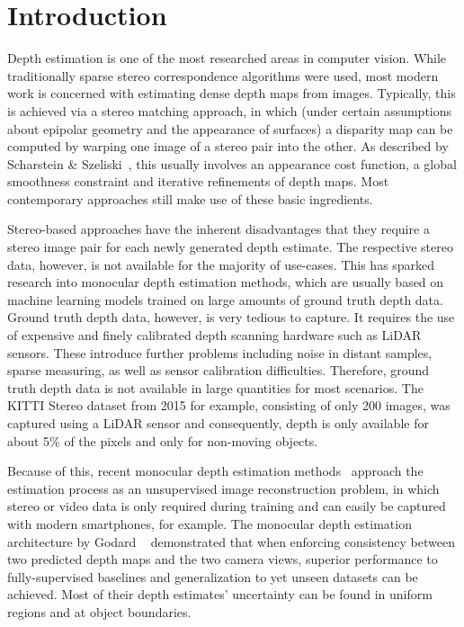 \section{Introduction}
Depth estimation is one of the most researched areas in computer vision.
While traditionally sparse stereo correspondence algorithms were used, most modern work is concerned with estimating dense depth maps from images.
Typically, this is achieved via a stereo matching approach, in which (under certain assumptions about epipolar geometry and the appearance of surfaces) a disparity map can be computed by warping one image of a stereo  pair into the other.
As described by Scharstein \& Szeliski~\cite{scharstein2002taxonomy}, this usually involves an appearance cost function, a global smoothness constraint and iterative refinements of depth maps.
Most contemporary approaches still make use of these basic ingredients.

Stereo-based approaches have the inherent disadvantages that they require a stereo image pair for each newly generated depth estimate.
The respective stereo data, however, is not available for the majority of use-cases.
This has sparked research into monocular depth estimation methods, which are usually based on machine learning models trained on large amounts of ground truth depth data.
Ground truth depth data, however, is very tedious to capture. 
It requires the use of expensive and finely calibrated depth scanning hardware such as LiDAR sensors. These introduce further problems including noise in distant samples, sparse measuring, as well as sensor calibration difficulties. Therefore, ground truth depth data is not available in large quantities for most scenarios.
The KITTI Stereo dataset from 2015 for example\cite{Menze2015CVPR}, consisting of only 200 images, was captured using a LiDAR sensor and consequently, depth is only available for about 5\% of the pixels and only for non-moving objects. 

Because of this, recent monocular depth estimation methods~\cite{garg2016unsupervised,Godard_2017_CVPR,Godard2018} approach the estimation process as an unsupervised image reconstruction problem, in which stereo or video data is only required during training and can easily be captured with modern smartphones, for example. 
The monocular depth estimation architecture by Godard \etal~\cite{Godard_2017_CVPR} demonstrated that when enforcing consistency between two predicted depth maps and the two camera views, superior performance to fully-supervised baselines and generalization to yet unseen datasets can be achieved.
Most of their depth estimates' uncertainty can be found in uniform regions and at object boundaries. 

